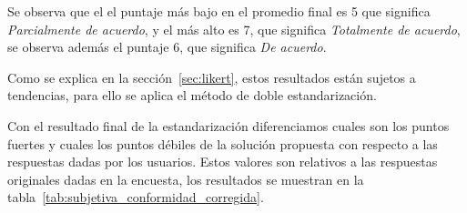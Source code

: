 Se observa que el el puntaje más bajo en el promedio final es 5 que significa
\textit{Parcialmente de acuerdo}, y el más alto es 7, que significa
\textit{Totalmente de acuerdo}, se observa además el puntaje 6, que significa
\textit{De acuerdo}. 


Como se explica en la sección~\ref{sec:likert}, estos resultados están sujetos a
tendencias, para ello se aplica el método de doble
estandarización\cite{Pagolu2011}.

Con el resultado final de la estandarización diferenciamos cuales son los puntos
fuertes y cuales los puntos débiles de la solución propuesta con respecto a las
respuestas dadas por los usuarios. Estos valores son relativos a las respuestas
originales dadas en la encuesta, los resultados se muestran en la
tabla~\ref{tab:subjetiva_conformidad_corregida}.

